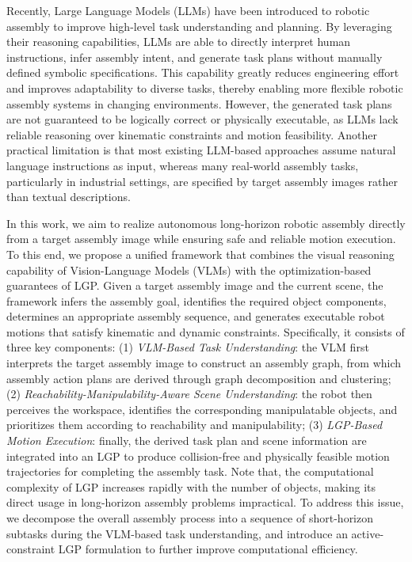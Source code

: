 \documentclass[journal]{IEEEtran}
\begin{document}
Recently, Large Language Models (LLMs) have been introduced to robotic assembly to improve high-level task understanding and planning. 
By leveraging their reasoning capabilities, LLMs are able to directly interpret human instructions, infer assembly intent, and generate task plans without manually defined symbolic specifications. 
This capability greatly reduces engineering effort and improves adaptability to diverse tasks, thereby enabling more flexible robotic assembly systems in changing environments. 
However, the generated task plans are not guaranteed to be logically correct or physically executable, as LLMs lack reliable reasoning over kinematic constraints and motion feasibility. 
Another practical limitation is that most existing LLM-based approaches assume natural language instructions as input, whereas many real-world assembly tasks, particularly in industrial settings, are specified by target assembly images rather than textual descriptions.

In this work, we aim to realize autonomous long-horizon robotic assembly directly from a target assembly image while ensuring safe and reliable motion execution. 
To this end, we propose a unified framework that combines the visual reasoning capability of Vision-Language Models (VLMs) with the optimization-based guarantees of LGP. 
Given a target assembly image and the current scene, the framework infers the assembly goal, identifies the required object components, determines an appropriate assembly sequence, and generates executable robot motions that satisfy kinematic and dynamic constraints. 
Specifically, it consists of three key components: 
(1) \textit{VLM-Based Task Understanding}: the VLM first interprets the target assembly image to construct an assembly graph, from which assembly action plans are derived through graph decomposition and clustering; 
(2) \textit{Reachability-Manipulability-Aware Scene Understanding}: the robot then perceives the workspace, identifies the corresponding manipulatable objects, and prioritizes them according to reachability and manipulability; 
(3) \textit{LGP-Based Motion Execution}: finally, the derived task plan and scene information are integrated into an LGP to produce collision-free and physically feasible motion trajectories for completing the assembly task. 
Note that, the computational complexity of LGP increases rapidly with the number of objects, making its direct usage in long-horizon assembly problems impractical. 
To address this issue, we decompose the overall assembly process into a sequence of short-horizon subtasks during the VLM-based task understanding, and introduce an active-constraint LGP formulation to further improve computational efficiency.
\end{document}
